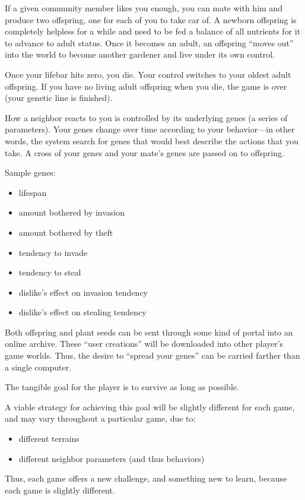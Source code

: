 \documentclass[12pt]{article}
\begin{document}
If a given community member likes you enough, you can mate with him and produce two offspring, one for each of you to take car of.
A newborn offspring is completely helpless for a while and need to be fed a balance of all nutrients for it to advance to adult status.
Once it becomes an adult, an offspring ``moves out'' into the world to become another gardener and live under its own control.

Once your lifebar hits zero, you die.
Your control switches to your oldest adult offspring.
If you have no living adult offspring when you die, the game is over (your genetic line is finished).

How a neighbor reacts to you is controlled by its underlying genes (a series of parameters).
Your genes change over time according to your behavior---in other words, the system search for genes that would best describe the actions that you take.
A cross of your genes and your mate's genes are passed on to offspring.

Sample genes:
\begin{itemize}
\item lifespan
\item amount bothered by invasion
\item amount bothered by theft
\item tendency to invade
\item tendency to steal
\item dislike's effect on invasion tendency
\item dislike's effect on stealing tendency
\end{itemize} 

Both offspring and plant seeds can be sent through some kind of portal into an online archive.
These ``user creations'' will be downloaded into other player's game worlds.
Thus, the desire to ``spread your genes'' can be carried farther than a single computer.

The tangible goal for the player is to survive as long as possible.

A viable strategy for achieving this goal will be slightly different for each game, and may vary throughout a particular game, due to:
\begin{itemize}
\item different terrains
\item different neighbor parameters (and thus behaviors)
\end{itemize}

Thus, each game offers a new challenge, and something new to learn, because each game is slightly different.
\end{document}
